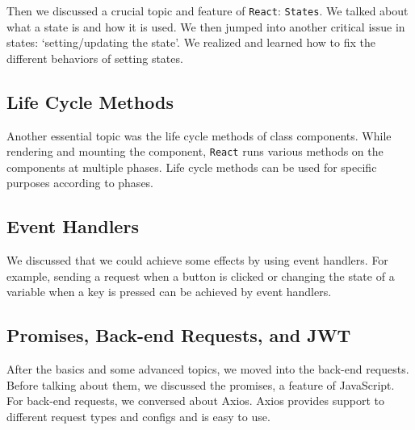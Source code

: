Then we discussed a crucial topic and feature of \texttt{React}: \texttt{States}. We talked about what a state is and how it is used. We then jumped into another critical issue in states: `setting/updating the state'. We realized and learned how to fix the different behaviors of setting states.

\subsection{Life Cycle Methods}

Another essential topic was the life cycle methods of class components. While rendering and mounting the component, \texttt{React} runs various methods on the components at multiple phases. Life cycle methods can be used for specific purposes according to phases.

\subsection{Event Handlers}

We discussed that we could achieve some effects by using event handlers. For example, sending a request when a button is clicked or changing the state of a variable when a key is pressed can be achieved by event handlers.

\subsection{Promises, Back-end Requests, and JWT}

After the basics and some advanced topics, we moved into the back-end requests. Before talking about them, we discussed the promises, a feature of JavaScript. For back-end requests, we conversed about Axios. Axios provides support to different request types and configs and is easy to use.
